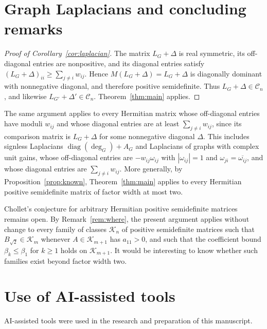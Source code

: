 \documentclass[11pt]{amsart}
\theoremstyle{remark}
\numberwithin{equation}{section}
\newcommand{\diag}{\operatorname{diag}}
\newcommand{\cC}{\mathcal{C}}
\newcommand{\conj}[1]{\overline{#1}}
\begin{document}
\section{Graph Laplacians and concluding remarks}\label{sec:remarks}

\begin{proof}[Proof of Corollary~\ref{cor:laplacian}]
The matrix $L_G+\Delta$ is real symmetric, its off-diagonal entries are nonpositive, and its diagonal entries satisfy $(L_G+\Delta)_{ii}\ge\sum_{j\ne i}w_{ij}$. Hence $M(L_G+\Delta)=L_G+\Delta$ is diagonally dominant with nonnegative diagonal, and therefore positive semidefinite. Thus $L_G+\Delta\in\cC_n$, and likewise $L_{G'}+\Delta'\in\cC_n$. Theorem~\ref{thm:main} applies.
\end{proof}

The same argument applies to every Hermitian matrix whose off-diagonal entries have moduli $w_{ij}$ and whose diagonal entries are at least $\sum_{j\ne i}w_{ij}$, since its comparison matrix is $L_G+\Delta$ for some nonnegative diagonal $\Delta$. This includes signless Laplacians $\diag(\deg_G)+A_G$ and Laplacians of graphs with complex unit gains, whose off-diagonal entries are $-w_{ij}\omega_{ij}$ with $|\omega_{ij}|=1$ and $\omega_{ji}=\conj{\omega_{ij}}$, and whose diagonal entries are $\sum_{j\ne i}w_{ij}$. More generally, by Proposition~\ref{prop:known}, Theorem~\ref{thm:main} applies to every Hermitian positive semidefinite matrix of factor width at most two.

Chollet's conjecture for arbitrary Hermitian positive semidefinite matrices remains open. By Remark~\ref{rem:where}, the present argument applies without change to every family of classes $\mathcal{K}_n$ of positive semidefinite matrices such that $B_{\sqrt2}\in\mathcal{K}_m$ whenever $A\in\mathcal{K}_{m+1}$ has $a_{11}>0$, and such that the coefficient bound $\beta_k\le\beta_1$ for $k\ge1$ holds on $\mathcal{K}_{m+1}$. It would be interesting to know whether such families exist beyond factor width two.

\section*{Use of AI-assisted tools}

AI-assisted tools were used in the research and preparation of this manuscript.
\end{document}
